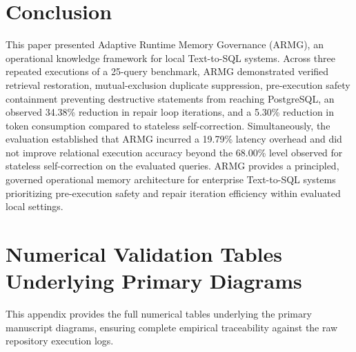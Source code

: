 \section{Conclusion}
This paper presented Adaptive Runtime Memory Governance (ARMG), an operational knowledge framework for local Text-to-SQL systems. Across three repeated executions of a 25-query benchmark, ARMG demonstrated verified retrieval restoration, mutual-exclusion duplicate suppression, pre-execution safety containment preventing destructive statements from reaching PostgreSQL, an observed 34.38\% reduction in repair loop iterations, and a 5.30\% reduction in token consumption compared to stateless self-correction. Simultaneously, the evaluation established that ARMG incurred a 19.79\% latency overhead and did not improve relational execution accuracy beyond the 68.00\% level observed for stateless self-correction on the evaluated queries. ARMG provides a principled, governed operational memory architecture for enterprise Text-to-SQL systems prioritizing pre-execution safety and repair iteration efficiency within evaluated local settings.

\appendix
\section{Numerical Validation Tables Underlying Primary Diagrams}

This appendix provides the full numerical tables underlying the primary manuscript diagrams, ensuring complete empirical traceability against the raw repository execution logs.

